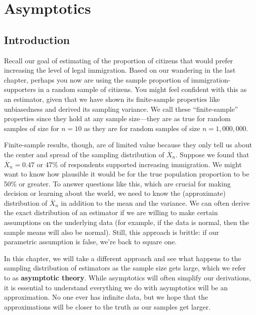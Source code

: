 \documentclass[
  letterpaper,
  DIV=11,
  numbers=noendperiod]{scrreprt}
\newcommand{\Xbar}{\overline{X}}
\theoremstyle{definition}
\theoremstyle{plain}
\theoremstyle{definition}
\theoremstyle{remark}
\begin{document}
\hypertarget{sec-asymptotics}{%
\chapter{Asymptotics}\label{sec-asymptotics}}

\hypertarget{introduction-3}{%
\section{Introduction}\label{introduction-3}}

Recall our goal of estimating of the proportion of citizens that would
prefer increasing the level of legal immigration. Based on our wandering
in the last chapter, perhaps you now are using the sample proportion of
immigration-supporters in a random sample of citizens. You might feel
confident with this as an estimator, given that we have shown its
finite-sample properties like unbiasedness and derived its sampling
variance. We call these ``finite-sample'' properties since they hold at
any sample size---they are as true for random samples of size for
\(n = 10\) as they are for random samples of size \(n = 1,000,000\).

Finite-sample results, though, are of limited value because they only
tell us about the center and spread of the sampling distribution of
\(\Xbar_n\). Suppose we found that \(\Xbar_n = 0.47\) or 47\% of
respondents supported increasing immigration. We might want to know how
plausible it would be for the true population proportion to be 50\% or
greater. To answer questions like this, which are crucial for making
decision or learning about the world, we need to know the (approximate)
distribution of \(\Xbar_n\) in addition to the mean and the variance. We
can often derive the exact distribution of an estimator if we are
willing to make certain assumptions on the underlying data (for example,
if the data is normal, then the sample means will also be normal).
Still, this approach is brittle: if our parametric assumption is false,
we're back to square one.

In this chapter, we will take a different approach and see what happens
to the sampling distribution of estimators as the sample size gets
large, which we refer to as \textbf{asymptotic theory}. While
asymptotics will often simplify our derivations, it is essential to
understand everything we do with asymptotics will be an approximation.
No one ever has infinite data, but we hope that the approximations will
be closer to the truth as our samples get larger.
\end{document}
